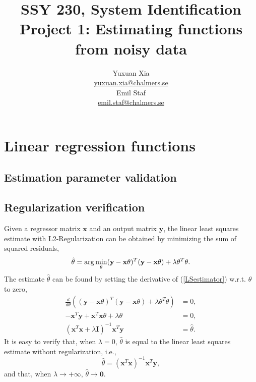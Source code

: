 \documentclass[]{article}
\title{SSY 230, System Identification\\
	Project 1: Estimating functions from noisy data}
\author{Yuxuan Xia\\ \href{mailto:yuxuan.xia@chalmers.se}{yuxuan.xia@chalmers.se}\\Emil Staf\\\href{mailto:emil.staf@chalmers.se}{emil.staf@chalmers.se}}
\begin{document}
\maketitle

\section{Linear regression functions}

\subsection{Estimation parameter validation}



\subsection{Regularization verification}

Given a regressor matrix $\mathbf{x}$ and an output matrix $\mathbf{y}$, the linear least squares estimate with L2-Regularization can be obtained by minimizing the sum of squared residuals,
\begin{equation}{\label{LSestimator}}
\hat{\theta} = \arg\min\limits_{\theta}(\mathbf{y}-\mathbf{x}\theta)^T(\mathbf{y}-\mathbf{x}\theta)+\lambda\theta^T\theta.
\end{equation}
The estimate $\hat{\theta}$ can be found by setting the derivative of (\ref{LSestimator}) w.r.t. $\theta$ to zero,
\begin{subequations}\label{LSderivative}
		\begin{align}
		\frac{d}{d\theta}\left((\mathbf{y}-\mathbf{x}\theta)^T(\mathbf{y}-\mathbf{x}\theta)+\lambda\theta^T\theta \right) &= 0,\\
		-\mathbf{x}^T\mathbf{y}+\mathbf{x}^T\mathbf{x}\theta+\lambda\theta &=0,\\
		(\mathbf{x}^T\mathbf{x}+\lambda\mathbf{I})^{-1}\mathbf{x}^T\mathbf{y} &=\hat{\theta}.
		\end{align}
\end{subequations}
It is easy to verify that, when $\lambda=0$, $\hat{\theta}$ is equal to the linear least squares estimate without regularization, i.e.,
\begin{equation}
\hat{\theta} = (\mathbf{x}^T\mathbf{x})^{-1}\mathbf{x}^T\mathbf{y},
\end{equation}
and that, when $\lambda\rightarrow +\infty$, $\hat{\theta}\rightarrow \mathbf{0}$.
\end{document}
